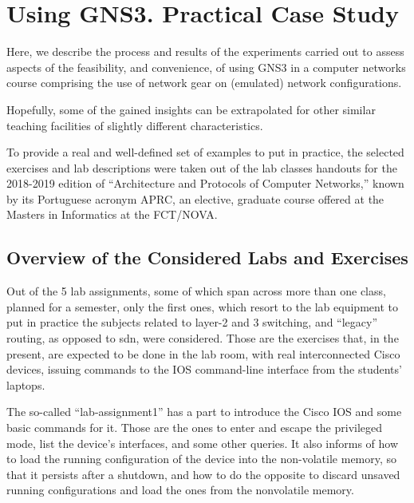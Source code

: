 \section{Using GNS3. Practical Case Study}
\label{sec:gns3practicalcasestudy}

Here, we describe the process and results of the experiments carried out to assess aspects of the feasibility, and convenience, of using GNS3 in a computer networks course comprising the use of network gear on (emulated) network configurations.

Hopefully, some of the gained insights can be extrapolated for other similar teaching facilities of slightly different characteristics.

To provide a real and well-defined set of examples to put in practice, the selected exercises and lab descriptions were taken out of the lab classes handouts for the 2018-2019 edition of ``Architecture and Protocols of Computer Networks,'' known by its Portuguese acronym APRC, an elective, graduate course offered at the Masters in Informatics at the FCT/NOVA.

\subsection{Overview of the Considered Labs and Exercises}
\label{subsec:gns3consideredlabs}

Out of the 5 lab assignments, some of which span across more than one class, planned for a semester, only the first ones, which resort to the lab equipment to put in practice the subjects related to layer-2 and 3 switching, and ``legacy'' routing, as opposed to \gls{sdn}, were considered. %
Those are the exercises that, in the present, are expected to be done in the lab room, with real interconnected Cisco devices, issuing commands to the IOS command-line interface from the students' laptops.

The so-called ``lab-assignment1'' has a part to introduce the Cisco IOS and some basic commands for it.
Those are the ones to enter and escape the privileged mode, list the device's interfaces, and some other queries.
It also informs of how to load the running configuration of the device into the non-volatile memory, so that it persists after a shutdown, and how to do the opposite to discard unsaved running configurations and load the ones from the nonvolatile memory.

